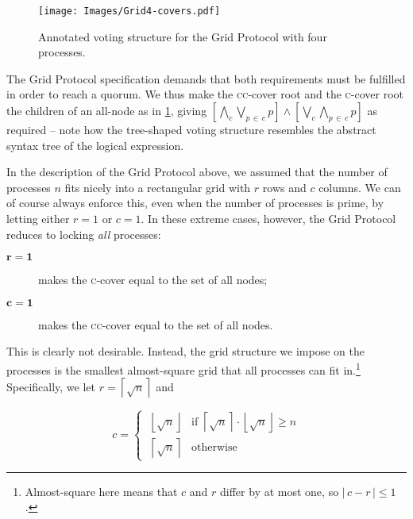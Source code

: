 \documentclass[11pt,chapterprefix=true,toc=bibliography,numbers=noendperiod,
               footnotes=multiple,twoside]{scrreprt}
\begin{document}
\begin{figure}[h]
    \centering
    \texttt{[image: Images/Grid4-covers.pdf]}
    \caption{Annotated voting structure for the Grid Protocol with four processes.}
    \label{fig:grid4-covers}
\end{figure}

The Grid Protocol specification demands that both requirements must be fulfilled in order to reach a quorum. We thus make the \textsc{cc}-cover root and the \textsc{c}-cover root the children of an all-node as in \cref{fig:grid4-covers}, giving \( \left[ \bigwedge_c \bigvee_{p\,\in\,c} p \right] \wedge \left[ \bigvee_c \bigwedge_{p\,\in\,c} p \right] \) as required -- note how the tree-shaped voting structure resembles the abstract syntax tree of the logical expression.


In the description of the Grid Protocol above, we assumed that the number of processes \(n\) fits nicely into a rectangular grid with \(r\) rows and \(c\) columns. We can of course always enforce this, even when the number of processes is prime, by letting either \(r = 1\) or \(c = 1\). In these extreme cases, however, the Grid Protocol reduces to locking \emph{all} processes:

\begin{description}
    \item[\(\mathbf{r = 1}\)] makes the \textsc{c}-cover equal to the set of all nodes;
    \item[\(\mathbf{c = 1}\)] makes the \textsc{cc}-cover equal to the set of all nodes.
\end{description}

This is clearly not desirable. Instead, the grid structure we impose on the processes is the smallest almost-square grid that all processes can fit in.\footnote{Almost-square here means that \(c\) and \(r\) differ by at most one, so \(|\,c - r\,| \leq 1\).} Specifically, we let \( r = \left\lceil \sqrt{n} \right\rceil \) and

\begin{equation}
    c =
    \begin{cases}
        \;\left\lfloor \sqrt{n} \right\rfloor
                 & \text{if } \left\lceil \sqrt{n} \right\rceil
                        \cdot \left\lfloor \sqrt{n} \right\rfloor \geq n \\[0.5em]
        \;\left\lceil \sqrt{n} \right\rceil & \text{otherwise}
    \end{cases}
    \label{eq:grid-dims}
\end{equation}
\end{document}
